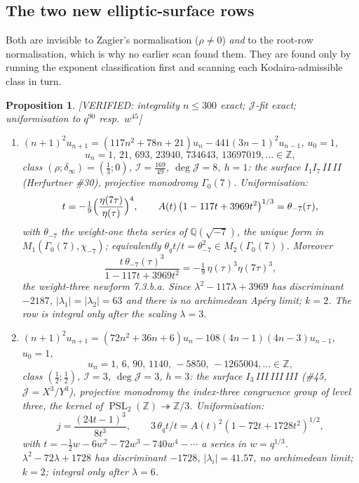 \documentclass[11pt,reqno]{amsart}
\theoremstyle{plain}
\newtheorem{proposition}[theorem]{Proposition}
\theoremstyle{definition}
\theoremstyle{remark}
\theoremstyle{plain}
\newcommand{\Z}{\mathbb{Z}}
\newcommand{\Q}{\mathbb{Q}}
\DeclareMathOperator{\PSL}{PSL}
\newcommand{\thq}{\theta_q}
\newcommand{\VerifiedR}[1]{\textup{\textsf{[VERIFIED: #1]}}}
\begin{document}
\subsection{The two new elliptic-surface rows}\label{sec:newrows}

Both are invisible to Zagier's normalisation ($\rho\neq0$) \emph{and} to the
root-row normalisation, which is why no earlier scan found them. They are found
only by running the exponent classification first and scanning each
Kodaira-admissible class in turn.

\begin{proposition}\label{prop:newrows}
\VerifiedR{integrality $n\le300$ exact; $\mathcal J$-fit exact; uniformisation to
$q^{90}$ resp.\ $w^{45}$}
\begin{enumerate}[label=\textup{(\alph*)},leftmargin=2.4em]
\item $(n+1)^2u_{n+1}=(117n^2+78n+21)u_n-441(3n-1)^2u_{n-1}$, $u_0=1$,
\[u_n=1,\,21,\,693,\,23940,\,734643,\,13697019,\dots\in\Z ,\]
class $(\rho;\delta_\infty)=(\tfrac13;0)$, $\mathcal I=\tfrac{169}{49}$,
$\deg\mathcal J=8$, $h=1$: the surface $I_1I_7\,II\,II$ \textup{(}Herfurtner
\#30\textup{)}, projective monodromy $\Gamma_0(7)$. Uniformisation:
\[
t=-\tfrac19\Bigl(\frac{\eta(7\tau)}{\eta(\tau)}\Bigr)^4,\qquad
A(t)\,\bigl(1-117t+3969t^2\bigr)^{1/3}=\theta_{-7}(\tau),
\]
with $\theta_{-7}$ the weight-one theta series of $\Q(\sqrt{-7})$, the unique
form in $M_1(\Gamma_0(7),\chi_{-7})$; equivalently
$\thq t/t=\theta_{-7}^2\in M_2(\Gamma_0(7))$. Moreover
\[
\frac{t\,\theta_{-7}(\tau)^3}{1-117t+3969t^2}=-\tfrac19\,\eta(\tau)^3\eta(7\tau)^3,
\]
the weight-three newform \textup{7.3.b.a}. Since
$\lambda^2-117\lambda+3969$ has discriminant $-2187$, $|\lambda_1|=|\lambda_2|=63$
and there is no archimedean Ap\'ery limit; $k=2$. The row is integral only after
the scaling $\lambda=3$.
\item $(n+1)^2u_{n+1}=(72n^2+36n+6)u_n-108(4n-1)(4n-3)u_{n-1}$, $u_0=1$,
\[u_n=1,\,6,\,90,\,1140,\,-5850,\,-1265004,\dots\in\Z ,\]
class $(\tfrac12;\tfrac12)$, $\mathcal I=3$, $\deg\mathcal J=3$, $h=3$: the
surface $I_3\,III\,III\,III$ \textup{(}\#45, $\mathcal J=X^3/Y^3$\textup{)},
projective monodromy the index-three congruence group of level three, the kernel
of $\PSL_2(\Z)\twoheadrightarrow\Z/3$. Uniformisation:
\[
j=\frac{(24t-1)^3}{8t^3},\qquad 3\,\thq t/t=A(t)^2(1-72t+1728t^2)^{1/2},
\]
with $t=-\tfrac12w-6w^2-72w^3-740w^4-\cdots$ a series in $w=q^{1/3}$.
$\lambda^2-72\lambda+1728$ has discriminant $-1728$, $|\lambda_i|=41.57$, no
archimedean limit; $k=2$; integral only after $\lambda=6$.
\end{enumerate}
\end{proposition}
\end{document}
